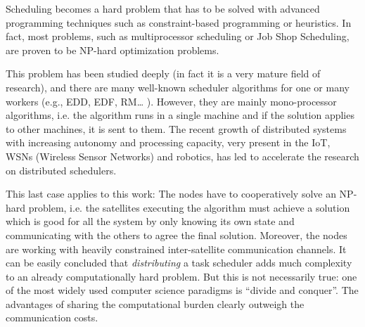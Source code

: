 Scheduling becomes a hard problem that has to be solved with advanced programming techniques such as constraint-based programming or heuristics. In fact, most problems, such as multiprocessor scheduling or Job Shop Scheduling, are proven to be NP-hard optimization problems.


This problem has been studied deeply (in fact it is a very mature field of research), and there are many well-known scheduler algorithms for one or many workers (e.g., EDD, EDF, RM… \cite{leung2004handbook}). However, they are mainly mono-processor algorithms, i.e. the algorithm runs in a single machine and if the solution applies to other machines, it is sent to them. The recent growth of distributed systems with increasing autonomy and processing capacity, very present in the IoT, WSNs (Wireless Sensor Networks) and robotics, has led to accelerate the research on distributed schedulers. 

This last case applies to this work: The nodes have to cooperatively solve an NP-hard problem, i.e. the satellites executing the algorithm must achieve a solution which is good for all the system by only knowing its own state and communicating with the others to agree the final solution. Moreover, the nodes are working with heavily constrained inter-satellite communication channels. It can be easily concluded that \emph{distributing} a task scheduler adds much complexity to an already computationally hard problem. But this is not necessarily true: one of the most widely used computer science paradigms is ``divide and conquer''. The advantages of sharing the computational burden clearly outweigh the communication costs. 

